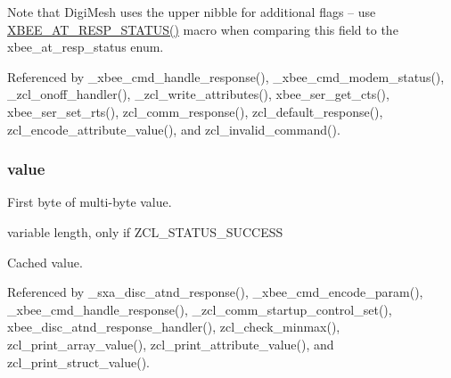 Note that Digi\-Mesh uses the upper nibble for additional flags -- use \hyperlink{group__xbee__atcmd_ga4dc292cd07dfd93bbfb2b8632b580949}{X\-B\-E\-E\-\_\-\-A\-T\-\_\-\-R\-E\-S\-P\-\_\-\-S\-T\-A\-T\-U\-S()} macro when comparing this field to the xbee\-\_\-at\-\_\-resp\-\_\-status enum. 

Referenced by \-\_\-xbee\-\_\-cmd\-\_\-handle\-\_\-response(), \-\_\-xbee\-\_\-cmd\-\_\-modem\-\_\-status(), \-\_\-zcl\-\_\-onoff\-\_\-handler(), \-\_\-zcl\-\_\-write\-\_\-attributes(), xbee\-\_\-ser\-\_\-get\-\_\-cts(), xbee\-\_\-ser\-\_\-set\-\_\-rts(), zcl\-\_\-comm\-\_\-response(), zcl\-\_\-default\-\_\-response(), zcl\-\_\-encode\-\_\-attribute\-\_\-value(), and zcl\-\_\-invalid\-\_\-command().

\hypertarget{group__xbee__atcmd_ga5bf2410fa8ec37f47f8afeba8dcc7f1b}{
\subsubsection[{value}]{ value}}\label{group__xbee__atcmd_ga5bf2410fa8ec37f47f8afeba8dcc7f1b}


First byte of multi-\/byte value. 

variable length, only if Z\-C\-L\-\_\-\-S\-T\-A\-T\-U\-S\-\_\-\-S\-U\-C\-C\-E\-S\-S

Cached value. 

Referenced by \-\_\-sxa\-\_\-disc\-\_\-atnd\-\_\-response(), \-\_\-xbee\-\_\-cmd\-\_\-encode\-\_\-param(), \-\_\-xbee\-\_\-cmd\-\_\-handle\-\_\-response(), \-\_\-zcl\-\_\-comm\-\_\-startup\-\_\-control\-\_\-set(), xbee\-\_\-disc\-\_\-atnd\-\_\-response\-\_\-handler(), zcl\-\_\-check\-\_\-minmax(), zcl\-\_\-print\-\_\-array\-\_\-value(), zcl\-\_\-print\-\_\-attribute\-\_\-value(), and zcl\-\_\-print\-\_\-struct\-\_\-value().


